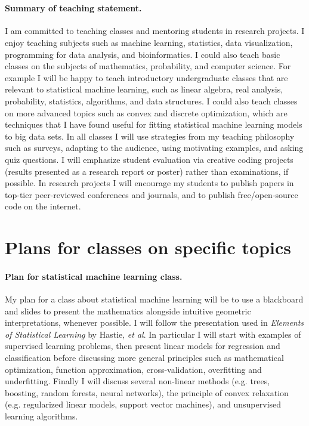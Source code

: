 \documentclass{article}
\begin{document}
 \mbox{ }


\paragraph{Summary of teaching statement.} I am committed to teaching
classes and mentoring students in research projects. I enjoy teaching
subjects such as machine learning, statistics, data visualization,
programming for data analysis, and bioinformatics. I could also teach
basic classes on the subjects of mathematics, probability, and
computer science. For example I will be happy to teach introductory
undergraduate classes that are relevant to statistical machine
learning, such as linear algebra, real analysis, probability,
statistics, algorithms, and data structures. I could also teach
classes on more advanced topics such as convex and discrete
optimization, which are techniques that I have found useful for
fitting statistical machine learning models to big data sets. In all classes I
will use strategies from my teaching philosophy such as surveys,
adapting to the audience, using motivating examples, and asking quiz
questions. I will emphasize student evaluation via creative coding
projects (results presented as a research report or poster) rather
than examinations, if possible. In research projects I will encourage
my students to publish papers in top-tier peer-reviewed conferences
and journals, and to publish free/open-source code on the internet.

\section{Plans for classes on specific topics}

\paragraph{Plan for statistical machine learning class.} My plan for a
class about statistical machine learning will be to use a blackboard
and slides to present the mathematics alongside intuitive geometric
interpretations, whenever possible. I will follow the presentation
used in \emph{Elements of Statistical Learning} by Hastie, \emph{et
  al}. In particular I will start with examples of supervised learning
problems, then present linear models for regression and classification
before discussing more general principles such as mathematical
optimization, function approximation, cross-validation, overfitting
and underfitting. Finally I will discuss several non-linear methods
(e.g. trees, boosting, random forests, neural networks), the principle
of convex relaxation (e.g. regularized linear models, support vector
machines), and unsupervised learning algorithms.
\end{document}
